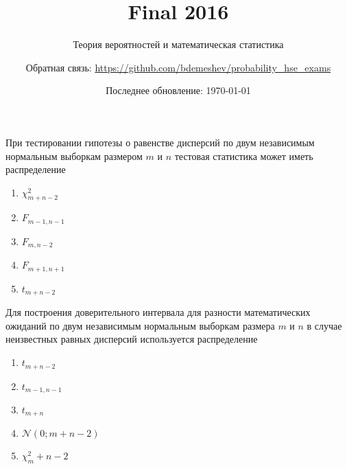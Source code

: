 \documentclass[t]{beamer}
\title{Final 2016}
\subtitle{Теория вероятностей и математическая статистика}
\author{Обратная связь: \url{https://github.com/bdemeshev/probability_hse_exams}}
\date{Последнее обновление: \today}
\newcommand{\cN}{\mathcal{N}}
\begin{document}
 

\frame[plain]{\titlepage}

 \begin{frame} \label{1} 
\begin{block}{1} 

  При тестировании гипотезы о равенстве дисперсий по двум независимым нормальным выборкам размером $m$ и $n$ тестовая статистика может иметь распределение


 \end{block} 
\begin{enumerate} 
\item[] \hyperlink{1-No}{\beamergotobutton{} $\chi^2_{m+n-2}$}
\item[] \hyperlink{1-Yes}{\beamergotobutton{} $F_{m-1,n-1}$}
\item[] \hyperlink{1-No}{\beamergotobutton{} $F_{m,n - 2}$}
\item[] \hyperlink{1-No}{\beamergotobutton{} $F_{m+1,n+1}$}
\item[] \hyperlink{1-No}{\beamergotobutton{} $t_{m+n-2}$}
\end{enumerate} 
\end{frame} 


 \begin{frame} \label{2} 
\begin{block}{2} 

  Для построения доверительного интервала для разности математических ожиданий по двум независимым нормальным выборкам размера $m$ и $n$ в случае неизвестных равных дисперсий используется распределение


 \end{block} 
\begin{enumerate} 
\item[] \hyperlink{2-Yes}{\beamergotobutton{} $t_{m+n-2}$}
\item[] \hyperlink{2-No}{\beamergotobutton{} $t_{m-1,n-1}$}
\item[] \hyperlink{2-No}{\beamergotobutton{} $t_{m+n}$}
\item[] \hyperlink{2-No}{\beamergotobutton{} $\cN(0;m+n-2)$}
\item[] \hyperlink{2-No}{\beamergotobutton{} $\chi^2_m+n-2$}
\end{enumerate} 
\end{frame} 
\end{document}
